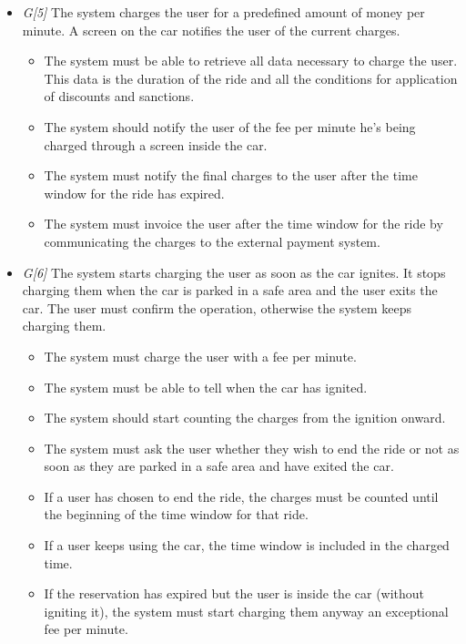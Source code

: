 \begin{itemize}
				\item \textit{G[5]} The system charges the user for a predefined amount of money per minute. A screen on the car notifies the user of the current charges.
					\begin{itemize}
						\item The system must be able to retrieve all data necessary to charge the user. This data is the duration of the ride and all the conditions for application of discounts and sanctions.
						\item The system should notify the user of the fee per minute he's being charged through a screen inside the car.
						\item The system must notify the final charges to the user after the time window for the ride has expired.
						\item The system must invoice the user after the time window for the ride by communicating the charges to the external payment system. 
						
					\end{itemize}
				
				\item \textit{G[6]} The system starts charging the user as soon as the car ignites. It stops charging them when the car is parked in a safe area and the user exits the car. The user must confirm the operation, otherwise the system keeps charging them. 
					\begin{itemize}
						\item The system must charge the user with a fee per minute.
						\item The system must be able to tell when the car has ignited. 
						\item The system should start counting the charges from the ignition onward. %
						\item The system must ask the user whether they wish to end the ride or not as soon as they are parked in a safe area and have exited the car.
						\item If a user has chosen to end the ride, the charges must be counted until the beginning of the time window for that ride. 
						\item If a user keeps using the car, the time window is included in the charged time.
						\item If the reservation has expired but the user is inside the car (without igniting it), the system must start charging them anyway an exceptional fee per minute. %
					\end{itemize}
					

\end{itemize}
